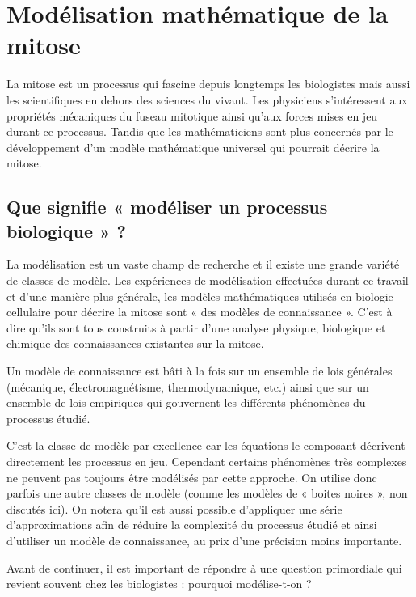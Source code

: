 \documentclass[12pt,a4paper,twoside,openright]{book}
\begin{document}
\section{Modélisation mathématique de la
mitose}\label{moduxe9lisation-mathuxe9matique-de-la-mitose}

La mitose est un processus qui fascine depuis longtemps les biologistes
mais aussi les scientifiques en dehors des sciences du vivant. Les
physiciens s'intéressent aux propriétés mécaniques du fuseau mitotique
ainsi qu'aux forces mises en jeu durant ce processus. Tandis que les
mathématiciens sont plus concernés par le développement d'un modèle
mathématique universel qui pourrait décrire la mitose.

\subsection{Que signifie « modéliser un processus biologique »
?}\label{que-signifie-moduxe9liser-un-processus-biologique}

La modélisation est un vaste champ de recherche et il existe une grande
variété de classes de modèle. Les expériences de modélisation effectuées
durant ce travail et d'une manière plus générale, les modèles
mathématiques utilisés en biologie cellulaire pour décrire la mitose
sont « des modèles de connaissance ». C'est à dire qu'ils sont tous
construits à partir d'une analyse physique, biologique et chimique des
connaissances existantes sur la mitose.

Un modèle de connaissance est bâti à la fois sur un ensemble de lois
générales (mécanique, électromagnétisme, thermodynamique, etc.) ainsi
que sur un ensemble de lois empiriques qui gouvernent les différents
phénomènes du processus étudié.

C'est la classe de modèle par excellence car les équations le composant
décrivent directement les processus en jeu. Cependant certains
phénomènes très complexes ne peuvent pas toujours être modélisés par
cette approche. On utilise donc parfois une autre classes de modèle
(comme les modèles de « boites noires », non discutés ici). On notera
qu'il est aussi possible d'appliquer une série d'approximations afin de
réduire la complexité du processus étudié et ainsi d'utiliser un modèle
de connaissance, au prix d'une précision moins importante.

Avant de continuer, il est important de répondre à une question
primordiale qui revient souvent chez les biologistes : pourquoi
modélise-t-on ?
\end{document}
